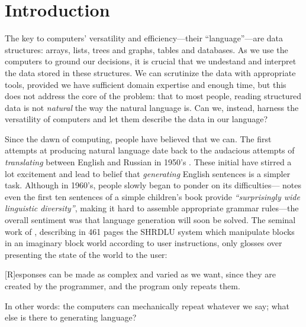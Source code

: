 \documentclass[12pt,notitlepage,a4paper,openright]{report}
\begin{document}
\cleardoublepage{}
\tableofcontents %

\cleardoublepage{}
\renewcommand{\chapterheadstartvskip}{\vspace*{-10mm}} %

%
%
\renewcommand{\thepage}{\arabic{page}}
\setcounter{page}{1}




\sloppy
% 
% 
% 

\chapter{Introduction}
\label{chap:intro}
The key to computers' versatility and efficiency---their ``language''---are data structures: arrays, lists, trees and graphs, tables and databases. As we use the computers to ground our decisions, it is crucial that we undestand and interpret the data stored in these structures. We can scrutinize the data with appropriate tools, provided we have sufficient domain expertise and enough time, but this does not address the core of the problem: that to most people, reading structured data is not \textit{natural} the way the natural language is. Can we, instead, harness the versatility of computers and let them describe the data in our language?


Since the dawn of computing, people have believed that we can. The first attempts at producing natural language date back to the audacious attempts of \textit{translating} between English and Russian in 1950's \cite{sheridan1955research}. These initial have stirred a lot excitement and lead to belief that \textit{generating} English sentences is a simpler task. Although in 1960's, people slowly began to ponder on its difficulties---\citet{yngve1961random} notes even the first ten sentences of a simple children's book provide \textit{``surprisingly wide linguistic diversity''}, making it hard to assemble appropriate grammar rules---the overall sentiment was that language generation will soon be solved. The seminal work of \citet{winograd1971procedures}, describing in 461 pages the SHRDLU system which manipulate blocks in an imaginary block world according to user instructions, only glosses over presenting the state of the world to the user:
\begin{pquotation}{\citealp[p.384]{winograd1971procedures}}
  [R]esponses can be made as complex and varied as we want, since they are created by the programmer, and the program only repeats them.
\end{pquotation}
In other words: the computers can mechanically repeat whatever we say; what else is there to generating language?
\end{document}
